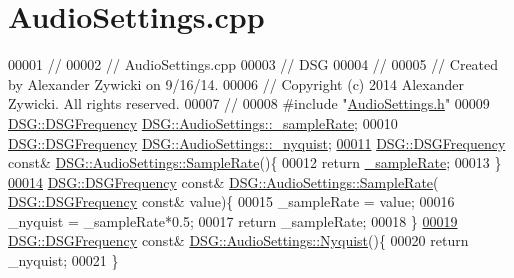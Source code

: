 \hypertarget{_audio_settings_8cpp_source}{\section{Audio\+Settings.\+cpp}
\label{_audio_settings_8cpp_source}
}

\begin{DoxyCode}
00001 \textcolor{comment}{//}
00002 \textcolor{comment}{//  AudioSettings.cpp}
00003 \textcolor{comment}{//  DSG}
00004 \textcolor{comment}{//}
00005 \textcolor{comment}{//  Created by Alexander Zywicki on 9/16/14.}
00006 \textcolor{comment}{//  Copyright (c) 2014 Alexander Zywicki. All rights reserved.}
00007 \textcolor{comment}{//}
00008 \textcolor{preprocessor}{#include "\hyperlink{_audio_settings_8h}{AudioSettings.h}"}
00009 \hyperlink{namespace_d_s_g_a4315a061386fa1014fda09b15d3a6973}{DSG::DSGFrequency} \hyperlink{class_d_s_g_1_1_audio_settings_a56869b51933f102b197f54001c8a1d27}{DSG::AudioSettings::\_sampleRate};
00010 \hyperlink{namespace_d_s_g_a4315a061386fa1014fda09b15d3a6973}{DSG::DSGFrequency} \hyperlink{class_d_s_g_1_1_audio_settings_af3c7cbd15390d9bcbe39983c069390b5}{DSG::AudioSettings::\_nyquist};
\hypertarget{_audio_settings_8cpp_source_l00011}{}\hyperlink{class_d_s_g_1_1_audio_settings_a4f459c389b10c11828e2f2f00c012c49}{00011} \hyperlink{namespace_d_s_g_a4315a061386fa1014fda09b15d3a6973}{DSG::DSGFrequency} \textcolor{keyword}{const}& \hyperlink{class_d_s_g_1_1_audio_settings_a4f459c389b10c11828e2f2f00c012c49}{DSG::AudioSettings::SampleRate}()\{
00012     \textcolor{keywordflow}{return} \hyperlink{class_d_s_g_1_1_audio_settings_a56869b51933f102b197f54001c8a1d27}{\_sampleRate};
00013 \}
\hypertarget{_audio_settings_8cpp_source_l00014}{}\hyperlink{class_d_s_g_1_1_audio_settings_a9c5640e47b6eaa4331a0e5053abb1314}{00014} \hyperlink{namespace_d_s_g_a4315a061386fa1014fda09b15d3a6973}{DSG::DSGFrequency} \textcolor{keyword}{const}& \hyperlink{class_d_s_g_1_1_audio_settings_a4f459c389b10c11828e2f2f00c012c49}{DSG::AudioSettings::SampleRate}(
      \hyperlink{namespace_d_s_g_a4315a061386fa1014fda09b15d3a6973}{DSG::DSGFrequency} \textcolor{keyword}{const}& value)\{
00015     \_sampleRate = value;
00016     \_nyquist = \_sampleRate*0.5;
00017     \textcolor{keywordflow}{return} \_sampleRate;
00018 \}
\hypertarget{_audio_settings_8cpp_source_l00019}{}\hyperlink{class_d_s_g_1_1_audio_settings_a8cb4afd7b58e927300ff46fbeb71bec7}{00019} \hyperlink{namespace_d_s_g_a4315a061386fa1014fda09b15d3a6973}{DSG::DSGFrequency} \textcolor{keyword}{const}& \hyperlink{class_d_s_g_1_1_audio_settings_a8cb4afd7b58e927300ff46fbeb71bec7}{DSG::AudioSettings::Nyquist}()\{
00020     \textcolor{keywordflow}{return} \_nyquist;
00021 \}
\end{DoxyCode}
